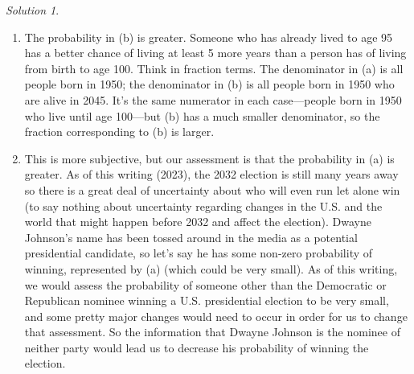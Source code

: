 \documentclass[
  letterpaper,
  DIV=11,
  numbers=noendperiod]{scrreprt}
\theoremstyle{plain}
\theoremstyle{definition}
\theoremstyle{definition}
\theoremstyle{definition}
\theoremstyle{remark}
\newtheorem{refsolution}{Solution}[chapter]
\begin{document}
\begin{tcolorbox}[enhanced jigsaw, opacityback=0, rightrule=.15mm, coltitle=black, colframe=quarto-callout-tip-color-frame, toprule=.15mm, colbacktitle=quarto-callout-tip-color!10!white, opacitybacktitle=0.6, left=2mm, toptitle=1mm, breakable, title={Solution (click to expand)}, bottomtitle=1mm, colback=white, leftrule=.75mm, titlerule=0mm, arc=.35mm, bottomrule=.15mm]

\begin{refsolution}
\leavevmode

\begin{enumerate}
\def\labelenumi{\arabic{enumi}.}
\item
  The probability in (b) is greater. Someone who has already lived to
  age 95 has a better chance of living at least 5 more years than a
  person has of living from birth to age 100. Think in fraction terms.
  The denominator in (a) is all people born in 1950; the denominator in
  (b) is all people born in 1950 who are alive in 2045. It's the same
  numerator in each case---people born in 1950 who live until age
  100---but (b) has a much smaller denominator, so the fraction
  corresponding to (b) is larger.
\item
  This is more subjective, but our assessment is that the probability in
  (a) is greater. As of this writing (2023), the 2032 election is still
  many years away so there is a great deal of uncertainty about who will
  even run let alone win (to say nothing about uncertainty regarding
  changes in the U.S. and the world that might happen before 2032 and
  affect the election). Dwayne Johnson's name has been tossed around in
  the media as a potential presidential candidate, so let's say he has
  some non-zero probability of winning, represented by (a) (which could
  be very small). As of this writing, we would assess the probability of
  someone other than the Democratic or Republican nominee winning a U.S.
  presidential election to be very small, and some pretty major changes
  would need to occur in order for us to change that assessment. So the
  information that Dwayne Johnson is the nominee of neither party would
  lead us to decrease his probability of winning the election.
\end{enumerate}

\label{sol-probability-interpret-conditional}

\end{refsolution}

\end{tcolorbox}
\end{document}

